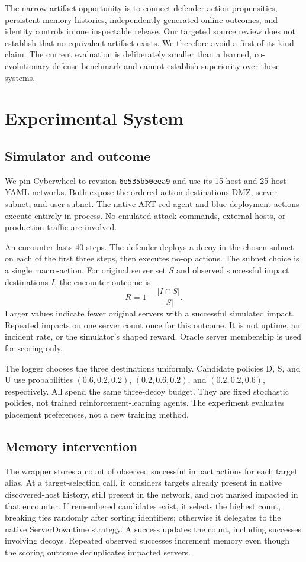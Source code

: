 \documentclass[sigconf,nonacm]{acmart}
\begin{document}
The narrow artifact opportunity is to connect defender action propensities, persistent-memory histories, independently generated online outcomes, and identity controls in one inspectable release. Our targeted source review does not establish that no equivalent artifact exists. We therefore avoid a first-of-its-kind claim. The current evaluation is deliberately smaller than a learned, co-evolutionary defense benchmark and cannot establish superiority over those systems.

\section{Experimental System}
\subsection{Simulator and outcome}
We pin Cyberwheel to revision \texttt{6e535b50eea9} and use its 15-host and 25-host YAML networks. Both expose the ordered action destinations DMZ, server subnet, and user subnet. The native ART red agent and blue deployment actions execute entirely in process. No emulated attack commands, external hosts, or production traffic are involved.

An encounter lasts 40 steps. The defender deploys a decoy in the chosen subnet on each of the first three steps, then executes no-op actions. The subnet choice is a single macro-action. For original server set $S$ and observed successful impact destinations $I$, the encounter outcome is
\begin{equation}
R=1-\frac{|I\cap S|}{|S|}.
\end{equation}
Larger values indicate fewer original servers with a successful simulated impact. Repeated impacts on one server count once for this outcome. It is not uptime, an incident rate, or the simulator's shaped reward. Oracle server membership is used for scoring only.

The logger chooses the three destinations uniformly. Candidate policies D, S, and U use probabilities $(0.6,0.2,0.2)$, $(0.2,0.6,0.2)$, and $(0.2,0.2,0.6)$, respectively. All spend the same three-decoy budget. They are fixed stochastic policies, not trained reinforcement-learning agents. The experiment evaluates placement preferences, not a new training method.

\subsection{Memory intervention}
The wrapper stores a count of observed successful impact actions for each target alias. At a target-selection call, it considers targets already present in native discovered-host history, still present in the network, and not marked impacted in that encounter. If remembered candidates exist, it selects the highest count, breaking ties randomly after sorting identifiers; otherwise it delegates to the native ServerDowntime strategy. A success updates the count, including successes involving decoys. Repeated observed successes increment memory even though the scoring outcome deduplicates impacted servers.
\end{document}
